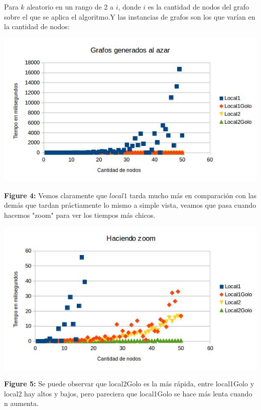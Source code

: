 \documentclass[a4paper]{article}
\begin{document}
Para $k$ aleatorio en un rango de 2 a $i$, donde $i$ es la cantidad de nodos del grafo sobre el que se aplica el algoritmo.Y las instancias de grafos son los que varían en la cantidad de nodos:

\includegraphics[width=\textwidth,height=\textheight,keepaspectratio
]{KaleN1-50.jpg}
\begin {flushleft}
\textbf{Figure 4:} Vemos claramente que $local1$ tarda mucho más en comparación con las demás que tardan práctiamente lo mismo a simple vista, veamos que pasa cuando hacemos "zoom" para ver los tiempos más chicos.
\end{flushleft}


\includegraphics[width=\textwidth,height=\textheight,keepaspectratio
]{KaleN1-50Zoom.jpg}
\begin {flushleft}
\textbf{Figure 5:} Se puede observar que local2Golo es la más rápida, entre local1Golo y local2 hay altos y bajos, pero pareciera que local1Golo se hace más lenta cuando n aumenta.
\end{flushleft}
\end{document}
